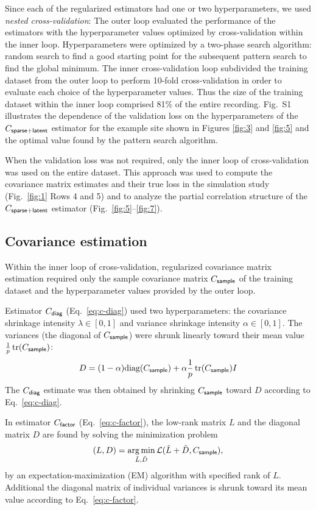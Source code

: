 Since each of the regularized estimators had one or two hyperparameters, we used \emph{nested cross-validation}:  The outer loop evaluated the performance of the estimators with the hyperparameter values optimized by cross-validation within the inner loop.  Hyperparameters were optimized by a two-phase search algorithm: random search to find a good starting point for the subsequent pattern search to find the global minimum.  The inner cross-validation loop subdivided the training dataset from the outer loop to perform 10-fold cross-validation in order to evaluate each choice of the hyperparameter values.  Thus the size of the training dataset within the inner loop comprised 81\% of the entire recording. Fig.~S1 illustrates the dependence of the validation loss on the hyperparameters of the $C_{\sf sparse+latent}$ estimator for the example site shown in Figures \ref{fig:3} and \ref{fig:5} and the optimal value found by the pattern search algorithm.

When the validation loss was not required, only the inner loop of cross-validation was used on the entire dataset.  This approach was used to compute the covariance matrix estimates and their true loss in the simulation study (Fig.~\ref{fig:1} Rows 4 and 5) and to analyze the partial correlation structure of the $C_{\sf sparse+latent}$ estimator (Fig.~\ref{fig:5}--\ref{fig:7}).

\subsection*{Covariance estimation}
Within the inner loop of cross-validation, regularized covariance matrix estimation required only the sample covariance matrix $C_{\sf sample}$ of the training dataset and the hyperparameter values provided by the outer loop.

Estimator $C_{\sf diag}$ (Eq.~\ref{eq:c-diag})  used two hyperparameters: the covariance shrinkage intensity $\lambda \in [0,1]$ and variance shrinkage intensity $\alpha \in [0,1]$.  The variances (the diagonal of $C_{\sf sample}$) were shrunk linearly toward their mean value $\frac 1 p \operatorname{tr}(C_{\sf sample})$:
\begin{equation}
D = (1-\alpha)\mbox{diag}(C_{\sf sample}) + \alpha \frac 1 p \operatorname{tr}(C_{\sf sample}) I
\end{equation}
The $C_{\sf diag}$ estimate was then obtained by shrinking $C_{\sf sample}$ toward $D$ according to Eq.~\ref{eq:c-diag}.

In estimator $C_{\sf factor}$ (Eq.~\ref{eq:c-factor}), the low-rank matrix $L$ and the diagonal matrix $D$ are found by solving the minimization problem
\begin{equation}
(L,D) = \operatorname*{arg\,min}\limits_{\hat L,\hat D} \mathcal L(\hat L + \hat D,C_{\sf sample}),
\end{equation}
by an expectation-maximization (EM) algorithm with specified rank of $L$. Additional the diagonal matrix of individual variances is shrunk toward its mean value according to Eq.~\ref{eq:c-factor}.

